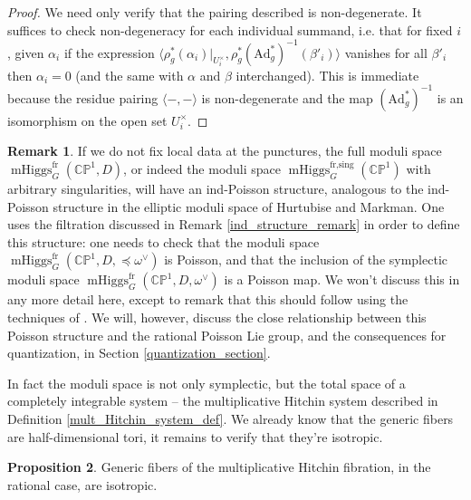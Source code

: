 \documentclass[11pt, oneside, reqno]{amsart}
\theoremstyle{definition} \newtheorem{definition}{Definition}[section]
\newtheorem{prop}[definition]{Proposition}
\theoremstyle{definition} \newtheorem{remark}[definition]{Remark}
\theoremstyle{definition} \newtheorem{remarks}[definition]{Remarks}
\theoremstyle{definition} \newtheorem{question}[definition]{Question}
\theoremstyle{definition} \newtheorem*{note}{Note}
\theoremstyle{definition} \newtheorem{example}[definition]{Example}
\theoremstyle{definition} \newtheorem{examples}[definition]{Examples}
\newcommand{\bb}[1]{\mathbb{#1}}
\newcommand{\mr}[1]{\mathrm{#1}}
\DeclareMathOperator{\mhiggs}{mHiggs}
\newcommand{\fr}{\mathrm{fr}}
\newcommand{\Ad}{\mr{Ad}}
\begin{document}
\begin{proof}
We need only verify that the pairing described is non-degenerate.  It suffices to check non-degeneracy for each individual summand, i.e. that for fixed $i$, given $\alpha_i$ if the expression $\langle \rho_g^*(\alpha_i)|_{U^\times_i}, \rho_g^*(\Ad_g^*)^{-1}(\beta'_i) \rangle$ vanishes for all $\beta'_i$ then $\alpha_i=0$ (and the same with $\alpha$ and $\beta$ interchanged).  This is immediate because the residue pairing $\langle - , - \rangle$ is non-degenerate and the map $(\Ad_g^*)^{-1}$ is an isomorphism on the open set $U^\times_i$.
\end{proof}

\begin{remark}
If we do not fix local data at the punctures, the full moduli space $\mhiggs_G^\fr(\bb{CP}^1,D)$, or indeed the moduli space $\mhiggs_G^{\text{fr,sing}}(\bb{CP}^1)$ with arbitrary singularities, will have an ind-Poisson structure, analogous to the ind-Poisson structure in the elliptic moduli space of Hurtubise and Markman.  One uses the filtration discussed in Remark \ref{ind_structure_remark} in order to define this structure: one needs to check that the moduli space  $\mhiggs_G^\fr(\bb{CP}^1,D, \preceq \omega^\vee)$ is Poisson, and that the inclusion of the symplectic moduli space $\mhiggs_G^\fr(\bb{CP}^1,D, \omega^\vee)$ is a Poisson map.  We won't discuss this in any more detail here, except to remark that this should follow using the techniques of \cite[Section 7]{HurtubiseMarkman}.  We will, however, discuss the close relationship between this Poisson structure and the rational Poisson Lie group, and the consequences for quantization, in Section \ref{quantization_section}.
\end{remark}

In fact the moduli space is not only symplectic, but the total space of a completely integrable system -- the multiplicative Hitchin system described in Definition \ref{mult_Hitchin_system_def}.  We already know that the generic fibers are half-dimensional tori, it remains to verify that they're isotropic.

\begin{prop} \label{Hitchin_isotropic_prop}
Generic fibers of the multiplicative Hitchin fibration, in the rational case, are isotropic.
\end{prop}
\end{document}
